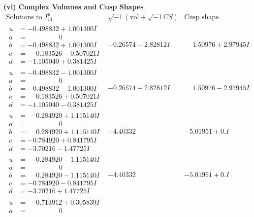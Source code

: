 \documentclass[1p]{elsarticle_modified}
\theoremstyle{definition}
\newcommand{\I}{\sqrt{-1}}
\begin{document}
\newpage\flushleft \textbf{(vi) Complex Volumes and Cusp Shapes}
$$\begin{array}{c|c|c}  
\text{Solutions to }I^u_{14}& \I (\text{vol} + \sqrt{-1}CS) & \text{Cusp shape}\\
 \hline 
\begin{aligned}
u &= -0.498832 + 1.001300 I \\
a &= \phantom{-0.000000 } 0 \\
b &= -0.498832 + 1.001300 I \\
c &= \phantom{-}0.183526 - 0.507021 I \\
d &= -1.105040 + 0.381425 I\end{aligned}
 & -0.26574 - 2.82812 I & \phantom{-}1.50976 + 2.97945 I \\ \hline\begin{aligned}
u &= -0.498832 - 1.001300 I \\
a &= \phantom{-0.000000 } 0 \\
b &= -0.498832 - 1.001300 I \\
c &= \phantom{-}0.183526 + 0.507021 I \\
d &= -1.105040 - 0.381425 I\end{aligned}
 & -0.26574 + 2.82812 I & \phantom{-}1.50976 - 2.97945 I \\ \hline\begin{aligned}
u &= \phantom{-}0.284920 + 1.115140 I \\
a &= \phantom{-0.000000 } 0 \\
b &= \phantom{-}0.284920 + 1.115140 I \\
c &= -0.784920 + 0.841795 I \\
d &= -3.70216 - 1.47725 I\end{aligned}
 & -4.40332\phantom{ +0.000000I} & -5.01951 + 0. I\phantom{ +0.000000I} \\ \hline\begin{aligned}
u &= \phantom{-}0.284920 - 1.115140 I \\
a &= \phantom{-0.000000 } 0 \\
b &= \phantom{-}0.284920 - 1.115140 I \\
c &= -0.784920 - 0.841795 I \\
d &= -3.70216 + 1.47725 I\end{aligned}
 & -4.40332\phantom{ +0.000000I} & -5.01951 + 0. I\phantom{ +0.000000I} \\ \hline\begin{aligned}
u &= \phantom{-}0.713912 + 0.305839 I \\
a &= \phantom{-0.000000 } 0 \\

\end{aligned}
\end{array}$$
\end{document}
